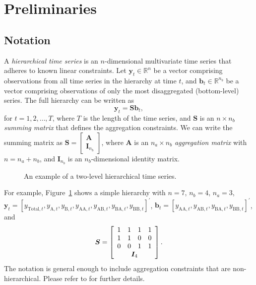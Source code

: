 \documentclass[
  11pt]{article}
\theoremstyle{plain}
\theoremstyle{remark}
\begin{document}
\section{Preliminaries}\label{sec-preliminaries}

\subsection{Notation}\label{notation}

A \emph{hierarchical time series} is an \(n\)-dimensional multivariate
time series that adheres to known linear constraints. Let
\(\bm{y}_t \in \mathbb{R}^n\) be a vector comprising observations from
all time series in the hierarchy at time \(t\), and
\(\bm{b}_t \in \mathbb{R}^{n_b}\) be a vector comprising observations of
only the most disaggregated (bottom-level) series. The full hierarchy
can be written as \[
\bm{y}_t = \bm{S}\bm{b}_t,
\] for \(t=1,2,\ldots,T\), where \(T\) is the length of the time series,
and \(\bm{S}\) is an \(n \times n_b\) \emph{summing matrix} that defines
the aggregation constraints. We can write the summing matrix as
\(\bm{S} = \left[\begin{array}{c}\bm{A} \\ \bm{I}_{n_b}\end{array}\right]\),
where \(\bm{A}\) is an \(n_a \times n_b\) \emph{aggregation matrix} with
\(n = n_a + n_b\), and \(\bm{I}_{n_b}\) is an \(n_b\)-dimensional
identity matrix.

\begin{figure}


\caption{\label{fig-hts}An example of a two-level hierarchical time
series.}

\end{figure}%

For example, Figure~\ref{fig-hts} shows a simple hierarchy with
\(n = 7\), \(n_b = 4\), \(n_a = 3\),
\(\bm{y}_t = [y_{\text{Total},t}, y_{\text{A},t}, y_{\text{B},t}, y_{\text{AA},t}, y_{\text{AB},t}, y_{\text{BA},t}, y_{\text{BB},t}]^{\prime}\),
\(\bm{b}_t = [y_{\text{AA},t}, y_{\text{AB},t}, y_{\text{BA},t}, y_{\text{BB},t}]^{\prime}\),
and \[
\bm{S} = \left[
\begin{array}{cccc}
1 & 1 & 1 & 1 \\
1 & 1 & 0 & 0 \\
0 & 0 & 1 & 1 \\
\multicolumn{4}{c}{\bm{I}_4}
\end{array}\right].
\] The notation is general enough to include aggregation constraints
that are non-hierarchical. Please refer to \citet{Hyndman2021-fo} for
further details.
\end{document}
